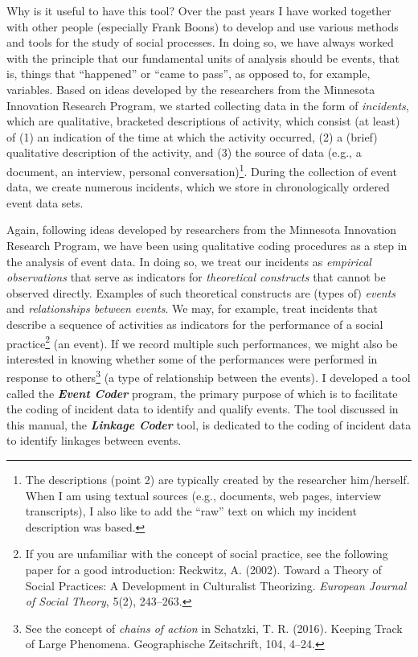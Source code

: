 \documentclass{memoir}
\begin{document}
Why is it useful to have this tool? Over the past years I have worked together with other people (especially Frank Boons) to develop and use various methods and tools for the study of social processes. In doing so, we have always worked with the principle that our fundamental units of analysis should be events, that is, things that ``happened'' or ``came to pass'', as opposed to, for example, variables. Based on ideas developed by the researchers from the Minnesota Innovation Research Program, we started collecting data in the form of \emph{incidents}, which are qualitative, bracketed descriptions of activity, which consist (at least) of (1) an indication of the time at which the activity occurred, (2) a (brief) qualitative description of the activity, and (3) the source of data (e.g., a document, an interview, personal conversation)\footnote{The descriptions (point 2) are typically created by the researcher him/herself. When I am using textual sources (e.g., documents, web pages, interview transcripts), I also like to add the ``raw'' text on which my incident description was based.}. During the collection of event data, we create numerous incidents, which we store in chronologically ordered event data sets.

Again, following ideas developed by researchers from the Minnesota Innovation Research Program, we have been using qualitative coding procedures as a step in the analysis of event data. In doing so, we treat our incidents as \emph{empirical observations} that serve as indicators for \emph{theoretical constructs} that cannot be observed directly. Examples of such theoretical constructs are (types of) \emph{events} and \emph{relationships between events}. We may, for example, treat incidents that describe a sequence of activities as indicators for the performance of a social practice\footnote{If you are unfamiliar with the concept of social practice, see the following paper for a good introduction: Reckwitz, A. (2002). Toward a Theory of Social Practices: A Development in Culturalist Theorizing. \emph{European Journal of Social Theory}, 5(2), 243–263.} (an event). If we record multiple such performances, we might also be interested in knowing whether some of the performances were performed in response to others\footnote{See the concept of \emph{chains of action} in Schatzki, T. R. (2016). Keeping Track of Large Phenomena. Geographische Zeitschrift, 104, 4–24.} (a type of relationship between the events). I developed a tool called the \emph{\textbf{Event Coder}} program, the primary purpose of which is to facilitate the coding of incident data to identify and qualify events. The tool discussed in this manual, the \emph{\textbf{Linkage Coder}} tool, is dedicated to the coding of incident data to identify linkages between events. 
\end{document}
